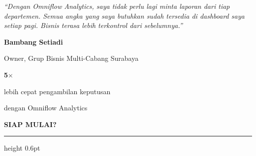 \documentclass[a4paper]{article}
\newcommand{\sectiontitle}[1]{%
    \vspace{10pt}%
    {\fontsize{13}{16}\selectfont\bfseries\color{BlueDark} #1}\par\vspace{3pt}%
    {\color{BluePrimary}\hrule height 0.6pt}\par\vspace{8pt}%
}
\begin{document}
\noindent
\begin{minipage}[t]{0.485\textwidth}
    \colorbox{BlueBg}{%
        \begin{minipage}{\dimexpr\linewidth-2\fboxsep\relax}
            \vspace{6pt}
            {\fontsize{9.5}{13}\selectfont\color{TextDark}\textit{``Dengan Omniflow Analytics, saya tidak perlu lagi minta laporan dari tiap departemen. Semua angka yang saya butuhkan sudah tersedia di dashboard saya setiap pagi. Bisnis terasa lebih terkontrol dari sebelumnya.''}}\par\vspace{4pt}
            {\fontsize{8.5}{11}\selectfont\bfseries\color{BluePrimary} Bambang Setiadi}\par
            {\fontsize{8}{10}\selectfont\color{TextLight} Owner, Grup Bisnis Multi-Cabang Surabaya}
            \vspace{6pt}
        \end{minipage}}
\end{minipage}%
\hfill
\begin{minipage}[t]{0.485\textwidth}
    \colorbox{BlueBg}{%
        \begin{minipage}{\dimexpr\linewidth-2\fboxsep\relax}
            \vspace{6pt}
            \begin{center}
                {\fontsize{20}{24}\selectfont\bfseries\color{IndigoPrimary} 5$\times$}\par
                {\fontsize{9.5}{12}\selectfont\color{TextDark} lebih cepat pengambilan keputusan}\par
                {\fontsize{9.5}{12}\selectfont\color{TextDark} dengan Omniflow Analytics}
            \end{center}
            \vspace{6pt}
        \end{minipage}}
\end{minipage}

\sectiontitle{SIAP MULAI?}
\end{document}
